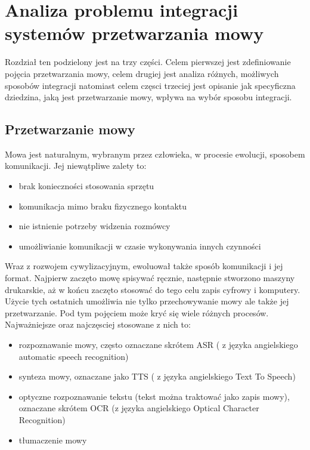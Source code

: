 
\chapter{Analiza problemu integracji systemów przetwarzania mowy} %



\ifpdf
    \graphicspath{{2/figures/PNG/}{2/figures/PDF/}{2/figures/}}
\else
    \graphicspath{{2/figures/EPS/}{2/figures/}}
\fi


Rozdział ten podzielony jest na trzy części. Celem pierwszej jest zdefiniowanie pojęcia przetwarzania mowy, celem drugiej jest analiza różnych, możliwych sposobów integracji natomiast celem częsci trzeciej jest opisanie jak specyficzna dziedzina, jaką jest przetwarzanie mowy, wpływa na wybór sposobu integracji.

\section{Przetwarzanie mowy}
Mowa jest naturalnym, wybranym przez człowieka, w procesie ewolucji, sposobem komunikacji. Jej niewątpliwe zalety to:
\begin{itemize}
	\item brak konieczności stosowania sprzętu
	\item komunikacja mimo braku fizycznego kontaktu
	\item nie istnienie potrzeby widzenia rozmówcy
	\item umożliwianie komunikacji w czasie wykonywania innych czynności
\end{itemize}
Wraz z rozwojem cywylizacyjnym, ewoluował także sposób komunikacji i jej format. Najpierw zaczęto mowę spisywać ręcznie, następnie stworzono maszyny drukarskie, aż w końcu zaczęto stosować do tego celu zapis cyfrowy i komputery. Użycie tych ostatnich umożliwia nie tylko przechowywanie mowy ale także jej przetwarzanie. Pod tym pojęciem może kryć się wiele różnych procesów. Najważniejsze oraz najczęsciej stosowane z nich to:
\begin{itemize}
	\item rozpoznawanie mowy, często oznaczane skrótem ASR ( z języka angielskiego automatic speech recognition)
	\item synteza mowy, oznaczane jako TTS ( z języka angielskiego Text To Speech)
	\item optyczne rozpoznawanie tekstu (tekst można traktować jako zapis mowy), oznaczane skrótem OCR (z języka angielskiego Optical Character Recognition)
	\item tłumaczenie mowy
\end{itemize} 
